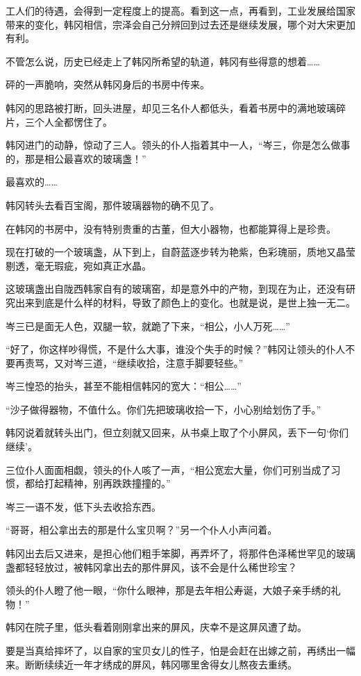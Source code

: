 工人们的待遇，会得到一定程度上的提高。看到这一点，再看到，工业发展给国家带来的变化，韩冈相信，宗泽会自己分辨回到过去还是继续发展，哪个对大宋更加有利。

不管怎么说，历史已经走上了韩冈所希望的轨道，韩冈有些得意的想着……

砰的一声脆响，突然从韩冈身后的书房中传来。

韩冈的思路被打断，回头进屋，却见三名仆人都低头，看着书房中的满地玻璃碎片，三个人全都愣住了。

韩冈进门的动静，惊动了三人。领头的仆人指着其中一人，“岑三，你是怎么做事的，那是相公最喜欢的玻璃盏！”

最喜欢的……

韩冈转头去看百宝阁，那件玻璃器物的确不见了。

在韩冈的书房中，没有特别贵重的古董，但大小器物，也都能算得上是珍贵。

现在打破的一个玻璃盏，从下到上，自蔚蓝逐步转为艳紫，色彩瑰丽，质地又晶莹剔透，毫无瑕疵，宛如真正水晶。

这玻璃盏出自陇西韩家自有的玻璃窑，却是意外中的产物，到现在为止，还没有研究出来到底是什么样的材料，导致了颜色上的变化。也就是说，是世上独一无二。

岑三已是面无人色，双腿一软，就跪了下来，“相公，小人万死……”

“好了，你这样吵得慌，不是什么大事，谁没个失手的时候？”韩冈让领头的仆人不要再责骂，又对岑三道，“继续收拾，注意手脚要轻些。”

岑三惶恐的抬头，甚至不能相信韩冈的宽大：“相公……”

“沙子做得器物，不值什么。你们先把玻璃收拾一下，小心别给划伤了手。”

韩冈说着就转头出门，但立刻就又回来，从书桌上取了个小屏风，丢下一句‘你们继续’。

三位仆人面面相觑，领头的仆人咳了一声，“相公宽宏大量，你们可别当成了习惯，都给打起精神，别再跌跌撞撞的。”

岑三一语不发，低下头去收拾东西。

“哥哥，相公拿出去的那是什么宝贝啊？”另一个仆人小声问着。

韩冈出去后又进来，是担心他们粗手笨脚，再弄坏了，将那件色泽稀世罕见的玻璃盏都轻轻放过，被韩冈拿出去的那件屏风，该不会是什么稀世珍宝？

领头的仆人瞪了他一眼，“你什么眼神，那是去年相公寿诞，大娘子亲手绣的礼物！”

韩冈在院子里，低头看着刚刚拿出来的屏风，庆幸不是这屏风遭了劫。

要是当真给摔坏了，以自家的宝贝女儿的性子，怕是会赶在出嫁之前，再绣出一幅来。断断续续近一年才绣成的屏风，韩冈哪里舍得女儿熬夜去重绣。

